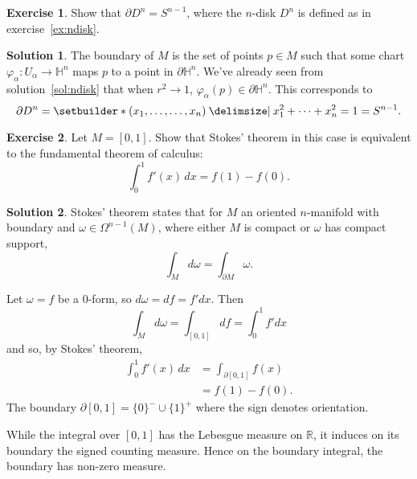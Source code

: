\documentclass[11pt, a4paper]{report}
\theoremstyle{definition}
\newtheorem{ex}{Exercise}[part]
\newtheorem{sol}{Solution}[part]
\newenvironment{nowidthtags}{\usetagform{nowidth}}{\ignorespacesafterend}
\begin{document}
\begin{ex}

Show that $\partial D^n = S^{n - 1}$, where the $n$-disk $D^n$ is defined as in exercise~\ref{ex:ndisk}.

\end{ex}

\begin{sol}

The boundary of $M$ is the set of points $p \in M$ such that some chart $\varphi_\alpha: U_\alpha \to \mathbb{H}^n$ maps $p$ to a point in $\partial\mathbb{H}^n$.
We've already seen from solution~\ref{sol:ndisk} that when $r^2 \to 1$, $\varphi_\alpha(p) \in \partial\mathbb{H}^n$. This corresponds to
\[
    \partial D^n = \setbuilder*{(x_1, \ldots, \ldots, x_n) \given x_1^2 + \cdots + x_n^2 = 1} = S^{n - 1}.
\]

\end{sol}

\begin{ex}

Let $M = [0, 1]$. Show that Stokes' theorem in this case is equivalent to the fundamental theorem of calculus:
\[
    \int_0^1 f'(x) \, dx = f(1) - f(0).
\]

\end{ex}

\begin{sol}

Stokes' theorem states that for $M$ an oriented $n$-manifold with boundary and $\omega \in \Omega^{n - 1}(M)$, where either $M$ is compact or $\omega$ has compact support,
\begin{nowidthtags}
\[
    \int_M d\omega = \int_{\partial M} \omega. \tag{Stokes' theorem}\label{eq:stokestheorem}
\]
\end{nowidthtags}

Let $\omega = f$ be a 0-form, so $d\omega = df = f' dx$. Then
\[
    \int_M d\omega = \int_{[0, 1]} df = \int_0^1 f' dx
\]
and so, by Stokes' theorem,
\begin{align*}
\int_0^1 f'(x) \, dx &= \int_{\partial [0, 1]} f(x) \\
                     &= f(1) - f(0).
\end{align*}
The boundary $\partial [0, 1] = {\{0\}}^-\! \cup {\{1\}}^+$ where the sign denotes orientation.

While the integral over $[0, 1]$ has the Lebesgue measure on $\mathbb{R}$, it induces on its boundary the signed counting measure. Hence on the boundary integral, the boundary has non-zero measure.

\end{sol}
\end{document}
